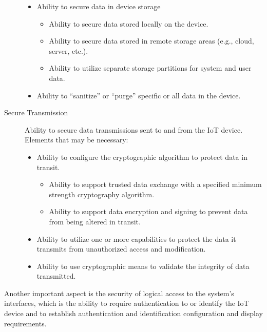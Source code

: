 \begin{description}
\begin{itemize}
\begin{itemize}
            \end{itemize}
            \item Ability to secure data in device storage
                \begin{itemize}
                    \item Ability to secure data stored locally on the device.
                    \item Ability to secure data stored in remote storage areas (e.g., cloud, server, etc.).
                    \item Ability to utilize separate storage partitions for system and user data.
                \end{itemize}
            \item Ability to “sanitize” or “purge” specific or all data in the device.
        \end{itemize}
        
    \item[Secure Transmission] Ability to secure data transmissions sent to and from the IoT device. Elements that may be necessary:
    \begin{itemize}
        \item Ability to configure the cryptographic algorithm to protect data in transit.
        \begin{itemize}
            \item Ability to support trusted data exchange with a specified minimum strength cryptography algorithm.
            \item Ability to support data encryption and signing to prevent data from being altered in transit.
        \end{itemize}
        \item Ability to utilize one or more capabilities to protect the data it transmits from unauthorized access and modification.
        \item Ability to use cryptographic means to validate the integrity of data transmitted.
    \end{itemize}
\end{description}

Another important aspect is the security of logical access to the system's interfaces, which is the ability to require authentication to or identify the IoT device and to establish authentication and identification configuration and display requirements.

